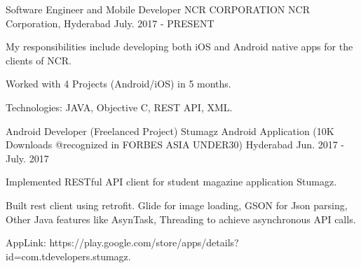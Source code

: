 


\begin{cventries}


  \cventry
    {Software Engineer and Mobile Developer} %
    {NCR CORPORATION} %
    {NCR Corporation, Hyderabad} %
    {July. 2017 - PRESENT} %
    {
      \begin{cvitems} %
        \item {My responsibilities include developing both iOS and Android native apps for the clients of NCR.}
        \item {Worked with 4 Projects (Android/iOS) in 5 months.}
        \item {Technologies: JAVA, Objective C, REST API, XML.}
      \end{cvitems}
    }
  \cventry
    {Android Developer (Freelanced Project)} %
    {Stumagz Android Application (10K Downloads @recognized in FORBES ASIA UNDER30)} %
    {Hyderabad} %
    {Jun. 2017 - July. 2017} %
    {
      \begin{cvitems} %
        \item {Implemented RESTful API client for student magazine application Stumagz.}
        \item {Built rest client using retrofit. Glide for image loading, GSON for Json parsing, Other Java features like AsynTask, Threading to achieve asynchronous API calls.}
        \item {AppLink: https://play.google.com/store/apps/details?id=com.tdevelopers.stumagz.\newline}
      \end{cvitems}
    }


\end{cventries}
